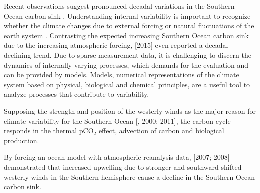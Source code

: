 Recent observations suggest pronounced decadal variations in the Southern Ocean carbon sink \citep{Roedenbeck2013,landschuetzer2015}. Understanding internal variability is important to recognize whether the climate changes due to external forcing or natural fluctuations of the earth system \citep{Murphy2004}. Contrasting the expected increasing Southern Ocean carbon sink due to the increasing atmospheric forcing, \citeauthor{landschuetzer2015} [{\color{RoyalBlue}2015}] even reported a decadal declining trend. %
Due to sparse measurement data, it is challenging to discern the dynamics of internally varying processes, which demands for the evaluation and can be provided by models. Models, numerical representations of the climate system based on physical, biological and chemical principles, are a useful tool to analyze processes that contribute to variability.\newline

Supposing the strength and position of the westerly winds as the major reason for climate variability for the Southern Ocean [\citeauthor{Thompson2011},  {\color{RoyalBlue}2000}; {\color{RoyalBlue}2011}], the carbon cycle responds in the thermal pCO$_2$ effect, advection of carbon and biological production.\newline

By forcing an ocean model with atmospheric reanalysis data, \citeauthor{Lovenduski2007} [{\color{RoyalBlue}2007}; {\color{RoyalBlue}2008}] demonstrated that increased upwelling due to stronger and southward shifted westerly winds in the Southern hemisphere cause a decline in the Southern Ocean carbon sink. %

